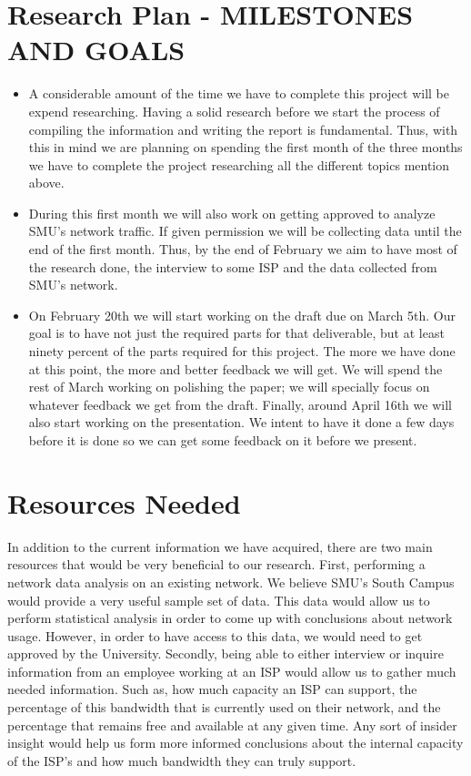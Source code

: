 \documentclass{sigcomm-alternate}
\begin{document}
\section{Research Plan - MILESTONES AND GOALS}

\begin{itemize}
	\item A considerable amount of the time we have to complete this project will be expend researching. Having a solid research before we start the process of compiling the information and writing the report is fundamental. Thus, with this in mind we are planning on spending the first month of the three months we have to complete the project researching all the different topics mention above. 
	
	\item During this first month we will also work on getting approved to analyze SMU's network traffic. If given permission we will be collecting data until the end of the first month. Thus, by the end of February we aim to have most of the research done, the interview to some ISP and the data collected from SMU's network. 
	
	\item On February 20th we will start working on the draft due on March 5th. Our goal is to have not just the required parts for that deliverable, but at least ninety percent of the parts required for this project. The more we have done at this point, the more and better feedback we will get. We will spend the rest of March working on polishing the paper; we will specially focus on whatever feedback we get from the draft. Finally, around April 16th we will also start working on the presentation. We intent to have it done a few days before it is done so we can get some feedback on it before we present.  
\end{itemize}






\section{Resources Needed}
In addition to the current information we have acquired, there are two main resources that would be very beneficial to our research. First, performing a network data analysis on an existing network. We believe SMU's South Campus would provide a very useful sample set of data. This data would allow us to perform statistical analysis in order to come up with conclusions about network usage. However, in order to have access to this data, we would need to get approved by the University. Secondly, being able to either interview or inquire information from an employee working at an ISP would allow us to gather much needed information. Such as, how much capacity an ISP can support, the percentage of this bandwidth that is currently used on their network, and the percentage that remains free and available at any given time. Any sort of insider insight would help us form more informed conclusions about the internal capacity of the ISP's and how much bandwidth they can truly support.





\end{document}
